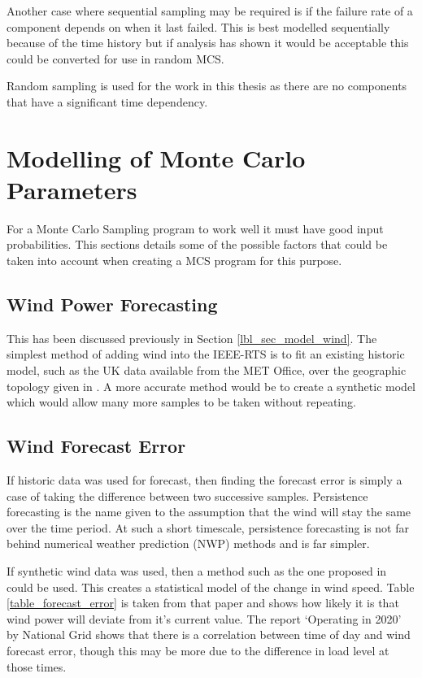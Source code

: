 \documentclass[a4paper,oneside,12pt]{report}
\newenvironment{vivacorrections}
{}
{}
\begin{document}
Another case where sequential sampling may be required is if the failure rate of a component depends on when it last failed. This is best modelled sequentially because of the time history but if analysis has shown it would be acceptable this could be converted for use in random MCS.

Random sampling is used for the work in this thesis as there are no components that have a significant time dependency.

\section{Modelling of Monte Carlo Parameters}

For a Monte Carlo Sampling program to work well it must have good input probabilities. This sections details some of the possible factors that could be taken into account when creating a MCS program for this purpose.

\subsection{Wind Power Forecasting}

This has been discussed previously in Section \ref{lbl_sec_model_wind}. The simplest method of adding wind into the IEEE-RTS is to fit an existing historic model, such as the UK data available from the MET Office, over the geographic topology given in \cite{Grigg1999}. A more accurate method would be to create a synthetic model which would allow many more samples to be taken without repeating.

\subsection{Wind Forecast Error}

If historic data was used for forecast, then finding the forecast error is simply a case of taking the difference between two successive samples. Persistence forecasting is the name given to the assumption that the wind will stay the same over the time period. At such a short timescale, persistence forecasting is not far behind numerical weather prediction (NWP) methods and is far simpler.

\begin{vivacorrections}

If synthetic wind data was used, then a method such as the one proposed in \cite{Bathurst2002} could be used. This creates a statistical model of the change in wind speed. Table \ref{table_forecast_error} is taken from that paper and shows how likely it is that wind power will deviate from it's current value. The report `Operating in 2020' by National Grid \cite{Grid2009} shows that there is a correlation between time of day and wind forecast error, though this may be more due to the difference in load level at those times. 

\end{vivacorrections}
\end{document}
